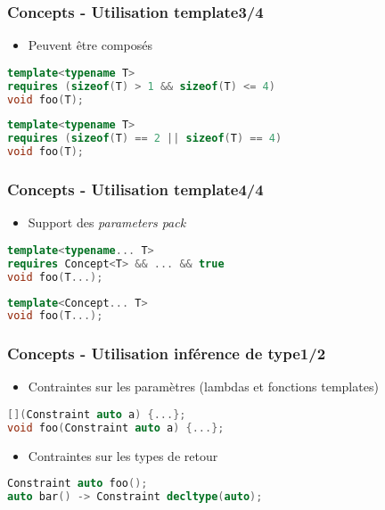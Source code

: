 \documentclass[C++.tex]{subfiles}
\begin{document}
\begin{frame}[fragile]
	\frametitle{Concepts - Utilisation template\titlehfill{}3/4}
	\begin{itemize}
		\item Peuvent être composés
	\end{itemize}

	\begin{lstlisting}[language=C++]
template<typename T>
requires (sizeof(T) > 1 && sizeof(T) <= 4)
void foo(T);\end{lstlisting}

	\begin{lstlisting}[language=C++]
template<typename T>
requires (sizeof(T) == 2 || sizeof(T) == 4)
void foo(T);\end{lstlisting}
\end{frame}

\begin{frame}[fragile]
	\frametitle{Concepts - Utilisation template\titlehfill{}4/4}
	\begin{itemize}
		\item Support des \textit{parameters pack}
	\end{itemize}

	\begin{lstlisting}[language=C++]
template<typename... T>
requires Concept<T> && ... && true
void foo(T...);\end{lstlisting}

	\begin{lstlisting}[language=C++]
template<Concept... T>
void foo(T...);\end{lstlisting}
\end{frame}

\begin{frame}[fragile]
	\frametitle{Concepts - Utilisation inférence de type\titlehfill{}1/2}
	\begin{itemize}
		\item Contraintes sur les paramètres (lambdas et fonctions templates)
	\end{itemize}

	\begin{lstlisting}[language=C++]
[](Constraint auto a) {...};
void foo(Constraint auto a) {...};\end{lstlisting}

	\begin{itemize}
		\item Contraintes sur les types de retour
	\end{itemize}

	\begin{lstlisting}[language=C++]
Constraint auto foo();
auto bar() -> Constraint decltype(auto);\end{lstlisting}
\end{frame}
\end{document}
